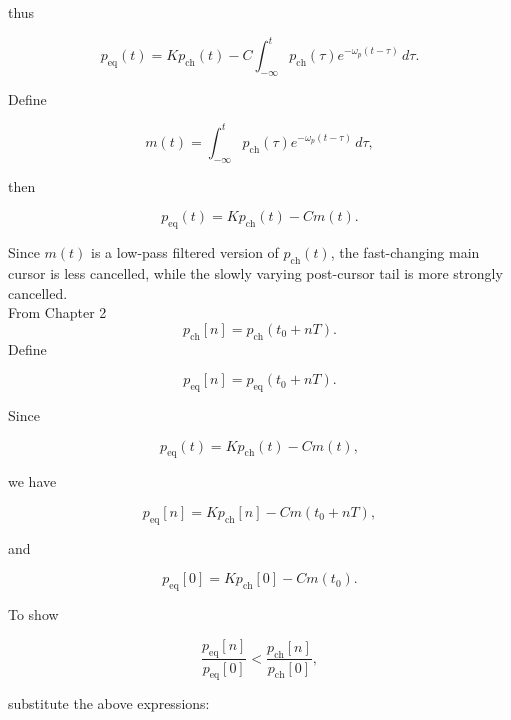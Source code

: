 thus

\begin{equation}
p_{\mathrm{eq}}(t)
=
Kp_{\mathrm{ch}}(t)
-
C\int_{-\infty}^{t}
p_{\mathrm{ch}}(\tau)
e^{-\omega_p(t-\tau)}\,d\tau.
\end{equation}

Define

\begin{equation}
m(t)
=
\int_{-\infty}^{t}
p_{\mathrm{ch}}(\tau)
e^{-\omega_p(t-\tau)}\,d\tau,
\end{equation}

then

\begin{equation}
p_{\mathrm{eq}}(t)
=
Kp_{\mathrm{ch}}(t)-Cm(t).
\end{equation}

Since \(m(t)\) is a low-pass filtered version of
\(p_{\mathrm{ch}}(t)\), the fast-changing main cursor is less
cancelled, while the slowly varying post-cursor tail is more strongly
cancelled.\\
From Chapter 2
\begin{equation}
p_{\mathrm{ch}}[n]
=
p_{\mathrm{ch}}(t_0+nT).
\end{equation}
Define

\begin{equation}
p_{\mathrm{eq}}[n]
=
p_{\mathrm{eq}}(t_0+nT).
\end{equation}

Since

\begin{equation}
p_{\mathrm{eq}}(t)
=
Kp_{\mathrm{ch}}(t)-Cm(t),
\end{equation}

we have

\begin{equation}
p_{\mathrm{eq}}[n]
=
Kp_{\mathrm{ch}}[n]
-
Cm(t_0+nT),
\end{equation}

and

\begin{equation}
p_{\mathrm{eq}}[0]
=
Kp_{\mathrm{ch}}[0]
-
Cm(t_0).
\end{equation}

To show

\begin{equation}
\frac{p_{\mathrm{eq}}[n]}{p_{\mathrm{eq}}[0]}
<
\frac{p_{\mathrm{ch}}[n]}{p_{\mathrm{ch}}[0]},
\end{equation}

substitute the above expressions:

